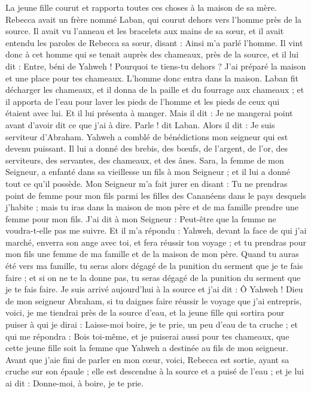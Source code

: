 \begin{multicols}{2}
La jeune fille courut et rapporta toutes ces choses à la maison de sa mère.
Rebecca avait un frère nommé Laban, qui courut dehors vers l’homme près de la source.
Il avait vu l’anneau et les bracelets aux mains de sa sœur, et il avait entendu les paroles de Rebecca sa sœur, disant : Ainsi m’a parlé l’homme. Il vint donc à cet homme qui se tenait auprès des chameaux, près de la source,
et il lui dit : Entre, béni de Yahweh ! Pourquoi te tiens-tu dehors ? J'ai préparé la maison et une place pour tes chameaux.
L'homme donc entra dans la maison. Laban fit décharger les chameaux, et il donna de la paille et du fourrage  aux chameaux ; et il apporta de l'eau pour laver les pieds de l’homme et les pieds de ceux qui étaient avec lui.
Et il lui présenta à manger. Mais il dit : Je ne mangerai point avant d’avoir dit  ce que j'ai à dire. Parle ! dit Laban.
Alors il dit : Je suis serviteur d'Abraham.
Yahweh a comblé de bénédictions mon seigneur qui est devenu puissant. Il lui a donné des brebis, des bœufs, de l'argent, de l'or, des serviteurs, des servantes, des chameaux, et des ânes.
Sara, la femme de mon Seigneur, a enfanté dans sa vieillesse un fils à mon Seigneur ; et il lui a donné tout ce qu'il possède.
Mon Seigneur m'a fait jurer en disant : Tu ne prendras point de femme pour mon fils parmi les filles des Cananéens dans le pays desquels j’habite ;
mais tu iras dans la maison de mon père et de ma famille prendre une femme pour mon fils.
J’ai dit à mon Seigneur : Peut-être que la femme ne voudra-t-elle pas me suivre.
Et il m’a répondu : Yahweh, devant la face de qui j'ai marché, enverra son ange avec toi, et fera réussir ton voyage ; et tu prendras pour mon fils une femme de ma famille et de la maison de mon père.
Quand tu auras été vers ma famille, tu seras alors dégagé de la punition du serment que je te fais faire ; et si on ne te la donne pas, tu seras dégagé de la punition du serment que je te fais faire.
Je suis arrivé aujourd'hui à la source et j'ai dit : Ô Yahweh ! Dieu de mon seigneur Abraham, si tu daignes faire réussir le voyage que j'ai entrepris,
voici, je me tiendrai près de la source d'eau, et la jeune fille qui sortira pour puiser à qui je dirai : Laisse-moi boire, je te prie, un peu d’eau de ta cruche ; et qui me répondra :
Bois toi-même, et je puiserai aussi pour tes chameaux, que cette jeune fille soit la femme que Yahweh a destinée au fils de mon seigneur.
Avant que j’aie fini de parler en mon cœur, voici, Rebecca est sortie, ayant sa cruche sur son épaule ; elle est descendue à la source et a puisé de l'eau ; et je lui ai dit : Donne-moi, à boire, je te prie.

\end{multicols}
